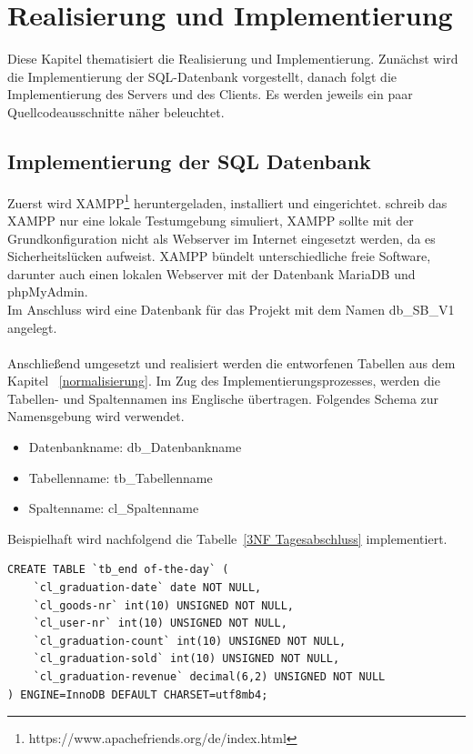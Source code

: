 \section{Realisierung und Implementierung}\label{realisierungundImplementierung}

Diese Kapitel thematisiert die Realisierung und Implementierung. Zunächst wird die Implementierung der SQL-Datenbank vorgestellt, danach folgt die Implementierung des Servers und des Clients. Es werden jeweils ein paar Quellcodeausschnitte näher beleuchtet.

\subsection{Implementierung der SQL Datenbank}

Zuerst wird XAMPP\footnote{https://www.apachefriends.org/de/index.html} heruntergeladen, installiert und eingerichtet. 
\cite{DB5} schreib das XAMPP nur eine lokale Testumgebung simuliert, XAMPP sollte mit der Grundkonfiguration nicht als Webserver im Internet eingesetzt werden, da es Sicherheitslücken aufweist. XAMPP bündelt unterschiedliche freie Software, darunter auch einen lokalen Webserver mit der Datenbank MariaDB und phpMyAdmin.
\\
Im Anschluss wird eine Datenbank für das Projekt mit dem Namen db\_SB\_V1 angelegt.
\\
\\
Anschließend umgesetzt und realisiert werden die entworfenen Tabellen aus dem Kapitel ~\ref{normalisierung}.
Im Zug des Implementierungsprozesses, werden die Tabellen- und Spaltennamen ins Englische übertragen. Folgendes Schema zur Namensgebung wird verwendet.
\begin{itemize}
	\itemsep0pt
	\item Datenbankname: db\_Datenbankname
	\item Tabellenname: tb\_Tabellenname
	\item Spaltenname: cl\_Spaltenname
\end{itemize}
Beispielhaft wird nachfolgend die Tabelle~\ref{3NF Tagesabschluss} implementiert. 



\lstset{language=SQL}
\begin{lstlisting}[frame=htrbl, caption={Erstellung der Tabelle tb\_end of-the-day mit Hilfe des SQL-Behelfes CREATE}, label={lst:tbWaren}]	
CREATE TABLE `tb_end of-the-day` (
	`cl_graduation-date` date NOT NULL,
	`cl_goods-nr` int(10) UNSIGNED NOT NULL,
	`cl_user-nr` int(10) UNSIGNED NOT NULL,
	`cl_graduation-count` int(10) UNSIGNED NOT NULL,
	`cl_graduation-sold` int(10) UNSIGNED NOT NULL,
	`cl_graduation-revenue` decimal(6,2) UNSIGNED NOT NULL
) ENGINE=InnoDB DEFAULT CHARSET=utf8mb4;

\end{lstlisting}	

